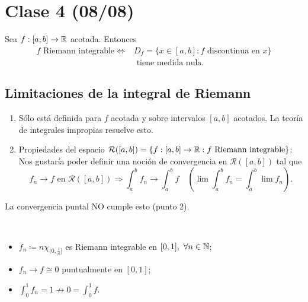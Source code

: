 \documentclass[a4paper]{report}
\begin{document}
	\section{Clase 4 (08/08)}

	\begin{theorem}
		Sea $f:[a,b]\to\mathbb{R}$ acotada. Entonces
		\begin{align*}
			f \text{ Riemann integrable}\Longleftrightarrow & D_f=\{x\in[a,b]:f\text{ discontinua en } x\} \\ & \text{ tiene medida nula.}
		\end{align*}
	\end{theorem}

	\subsection{Limitaciones de la integral de Riemann}

	\begin{enumerate}
		\item Sólo está definida para $f$ acotada y sobre intervalos $[a,b]$ acotados. La teoría de integrales impropias resuelve esto.

		\item Propiedades del espacio $\mathcal{R}([a,b])=\{f:[a,b]\to\mathbb{R}:f\text{ Riemann integrable}\}$: Nos gustaría poder definir una noción de convergencia en $\mathcal{R}([a,b])$ tal que
		\[
		f_n\to f \text { en } \mathcal{R}([a,b]) \Rightarrow \int_{a}^{b} f_n\to \int_{a}^{b} f \quad \left( \lim \int_{a}^{b} f_n = \int_{a}^{b} \lim f_n \right).
		\]
	\end{enumerate}

	\begin{remark}
		La convergencia puntal NO cumple esto (punto 2).
	\end{remark}

	\begin{eg}[1]~
		\begin{itemize}
			\item $f_n \coloneq n \chi_{(0,\frac{1}{n}]}$ es Riemann integrable en $[0,1],\ \forall n \in \mathbb{N}$;

			\item $f_n \to f \cong 0$ puntualmente en $[0,1]$;

			\item $\int_{0}^{1} f_n = 1 \not\to 0 = \int_{0}^{1} f$.
		\end{itemize}
	\end{eg}
\end{document}

